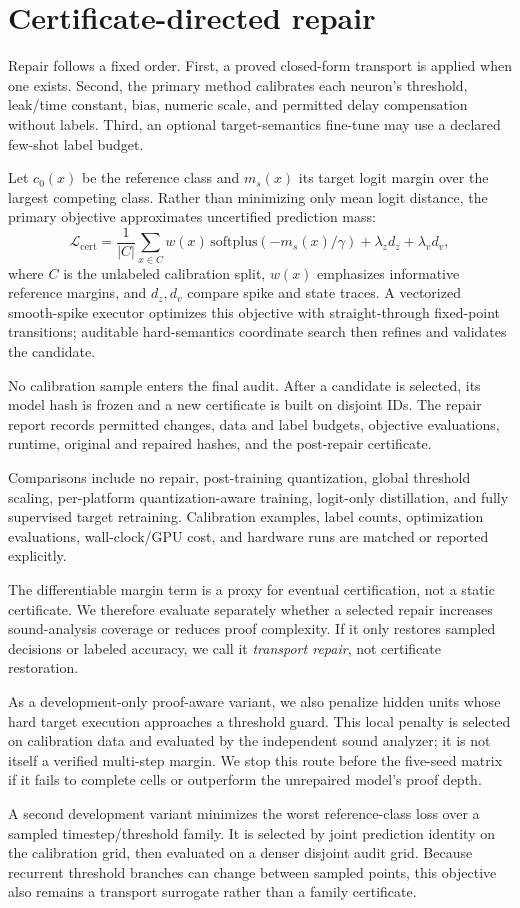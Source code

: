 \section{Certificate-directed repair}

Repair follows a fixed order. First, a proved closed-form transport is applied
when one exists. Second, the primary method calibrates each neuron's threshold,
leak/time constant, bias, numeric scale, and permitted delay compensation without
labels. Third, an optional target-semantics fine-tune may use a declared few-shot
label budget.

Let $c_0(x)$ be the reference class and $m_s(x)$ its target logit margin over the
largest competing class. Rather than minimizing only mean logit distance, the
primary objective approximates uncertified prediction mass:
\begin{equation}
\mathcal{L}_{\mathrm{cert}}=
\frac{1}{|C|}\sum_{x\in C}w(x)\,\mathrm{softplus}(-m_s(x)/\gamma)
+\lambda_z d_z+\lambda_v d_v,
\end{equation}
where $C$ is the unlabeled calibration split, $w(x)$ emphasizes informative
reference margins, and $d_z,d_v$ compare spike and state traces. A vectorized
smooth-spike executor optimizes this objective with straight-through fixed-point
transitions; auditable hard-semantics coordinate search then refines and validates
the candidate.

No calibration sample enters the final audit. After a candidate is selected, its
model hash is frozen and a new certificate is built on disjoint IDs. The repair
report records permitted changes, data and label budgets, objective evaluations,
runtime, original and repaired hashes, and the post-repair certificate.

Comparisons include no repair, post-training quantization, global threshold
scaling, per-platform quantization-aware training, logit-only distillation, and
fully supervised target retraining. Calibration examples, label counts,
optimization evaluations, wall-clock/GPU cost, and hardware runs are matched or
reported explicitly.

The differentiable margin term is a proxy for eventual certification, not a
static certificate. We therefore evaluate separately whether a selected repair
increases sound-analysis coverage or reduces proof complexity. If it only
restores sampled decisions or labeled accuracy, we call it \emph{transport
repair}, not certificate restoration.

As a development-only proof-aware variant, we also penalize hidden units whose
hard target execution approaches a threshold guard. This local penalty is
selected on calibration data and evaluated by the independent sound analyzer;
it is not itself a verified multi-step margin. We stop this route before the
five-seed matrix if it fails to complete cells or outperform the unrepaired
model's proof depth.

A second development variant minimizes the worst reference-class loss over a
sampled timestep/threshold family. It is selected by joint prediction identity
on the calibration grid, then evaluated on a denser disjoint audit grid. Because
recurrent threshold branches can change between sampled points, this objective
also remains a transport surrogate rather than a family certificate.

